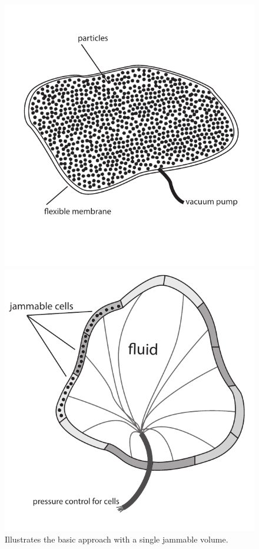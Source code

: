\begin{figure}
  \centering
  \begin{minipage}[t]{.44\textwidth}
    \centering
    \includegraphics[width=\linewidth]{figures/jamming/basic_jamming}
    \caption[The basic jamming approach.]
    {Illustrates the basic approach with a single jammable volume.}
    \label{fig:ch:jamming:approaches:basic}     
  \end{minipage}
  \hspace{0.02\textwidth}
  \begin{minipage}[t]{.44\textwidth}
    \centering
    \includegraphics[width=\linewidth]{figures/jamming/cell_jamming}

\end{minipage}
\end{figure}
